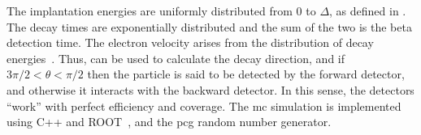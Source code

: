 The implantation energies are uniformly distributed from $0$ to $\Delta$, as defined in . The decay times are exponentially distributed and the sum of the two is the beta detection time. The electron velocity arises from the distribution of decay energies~\cite{Mougeot2015}. Thus,  can be used to calculate the decay direction, and if $3\pi/2<\theta<\pi/2$ then the particle is said to be detected by the forward detector, and otherwise it interacts with the backward detector. In this sense, the detectors ``work'' with perfect efficiency and coverage. The \gls{mc} simulation is implemented using C++ and  ROOT~\cite{Antcheva2009a}, and the \gls{pcg} random number generator.
